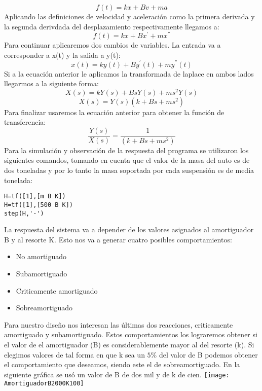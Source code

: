 \begin{equation}
f(t)=kx+Bv+ma
\end{equation}
Aplicando las definiciones de velocidad y aceleración como la primera derivada y la segunda derivdada del desplazamiento respectivamente llegamos a:
\begin{equation}
f(t)=kx+Bx^{'}+mx^{''}
\end{equation}
Para continuar aplicaremos dos cambios de variables. La entrada va a corresponder a x(t) y la salida a y(t):
\begin{equation}
x(t)=ky(t)+By^{'}(t)+my^{''}(t)
\end{equation}
Si a la ecuación anterior le aplicamos la transformada de laplace en ambos lados llegarmos a la siguiente forma:
\begin{equation}
X(s)=kY(s)+BsY(s)+ms^2Y(s)
\end{equation}
\begin{equation}
X(s)=Y(s)(k+Bs+ms^2)
\end{equation}
Para finalizar usaremos la ecuación anterior para obtener la función de transferencia:
\begin{equation}
\frac{Y(s)}{X(s)}=\frac{1}{(k+Bs+ms^2)}
\end{equation}
Para la simulación y observación de la respuesta del programa se utilizaron los siguientes comandos, tomando en cuenta que el valor de la masa del auto es de dos toneladas y por lo tanto la masa soportada por cada suspensión es de media tonelada:
\begin{verbatim}
H=tf([1],[m B K])
H=tf([1],[500 B K])
step(H,'-')
\end{verbatim}
La respuesta del sistema va a depender de los valores asignados al amortiguador B y al resorte K. Esto nos va a generar cuatro posibles comportamientos:
\begin{itemize}
\item No amortiguado
\item Subamortiguado
\item Criticamente amortiguado
\item Sobreamortiguado
\end{itemize}
Para nuestro diseño nos interesan las últimas dos reacciones, criticamente amortiguado y subamortiguado. Estos comportamientos los lograremos obtener si el valor de el amortiguador (B) es considerablemente mayor al del resorte (k). Si elegimos valores de tal forma en que k sea un $5\%$ del valor de B podemos obtener el comportamiento que deseamos, siendo este el de sobreamortiguado. En la siguiente gráfica se usó un valor de B de dos mil y de k de cien.
\texttt{[image: AmortiguadorB2000K100]}\\